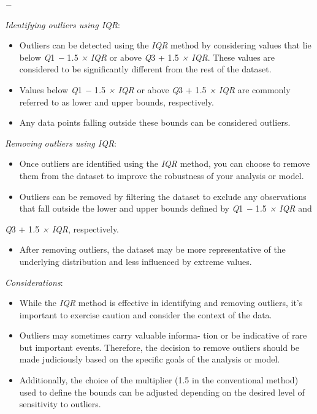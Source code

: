 \emph{−}

\emph{Identifying outliers using IQR}:

\begin{itemize}
\item
  Outliers can be detected using the \emph{IQR} method by considering
  values that lie below \emph{Q}1 \emph{−} 1\emph{.}5 \emph{×}
  \emph{IQR} or above \emph{Q}3 + 1\emph{.}5 \emph{× IQR}. These values
  are considered to be significantly different from the rest of the
  dataset.
\item
  Values below \emph{Q}1 \emph{−} 1\emph{.}5 \emph{× IQR} or above
  \emph{Q}3 + 1\emph{.}5 \emph{×} \emph{IQR} are commonly referred to as
  lower and upper bounds, respectively.
\item
  Any data points falling outside these bounds can be considered
  outliers.
\end{itemize}

\emph{Removing outliers using IQR}:

\begin{itemize}
\item
  Once outliers are identified using the \emph{IQR} method, you can
  choose to remove them from the dataset to improve the robustness of
  your analysis or model.
\item
  Outliers can be removed by filtering the dataset to exclude any
  observations that fall outside the lower and upper bounds defined by
  \emph{Q}1 \emph{−} 1\emph{.}5 \emph{× IQR} and
\end{itemize}

\emph{Q}3 + 1\emph{.}5 \emph{× IQR}, respectively.

\begin{itemize}
\item
  After removing outliers, the dataset may be more representative of the
  underlying distribution and less influenced by extreme values.
\end{itemize}

\emph{Considerations}:

\begin{itemize}
\item
  While the \emph{IQR} method is effective in identifying and removing
  outliers, it's important to exercise caution and consider the context
  of the data.
\item
  Outliers may sometimes carry valuable informa- tion or be indicative
  of rare but important events. Therefore, the decision to remove
  outliers should be made judiciously based on the specific goals of the
  analysis or model.
\item
  Additionally, the choice of the multiplier (1.5 in the conventional
  method) used to define the bounds can be adjusted depending on the
  desired level of sensitivity to outliers.
\end{itemize}

